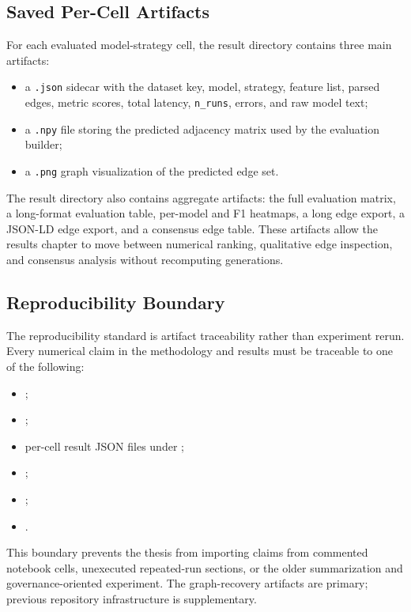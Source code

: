 \subsection{Saved Per-Cell Artifacts}

For each evaluated model-strategy cell, the result directory contains three
main artifacts:

\begin{itemize}
  \item a \texttt{.json} sidecar with the dataset key, model, strategy, feature
  list, parsed edges, metric scores, total latency, \texttt{n\_runs}, errors,
  and raw model text;
  \item a \texttt{.npy} file storing the predicted adjacency matrix used by the
  evaluation builder;
  \item a \texttt{.png} graph visualization of the predicted edge set.
\end{itemize}

The result directory also contains aggregate artifacts: the full evaluation
matrix, a long-format evaluation table, per-model and F1 heatmaps, a long edge
export, a JSON-LD edge export, and a consensus edge table. These artifacts
allow the results chapter to move between numerical ranking, qualitative edge
inspection, and consensus analysis without recomputing generations.

\subsection{Reproducibility Boundary}

The reproducibility standard is artifact traceability rather than experiment
rerun. Every numerical claim in the methodology and results must be traceable
to one of the following:

\begin{itemize}
  \item {};
  \item {};
  \item per-cell result JSON files under ;
  \item {};
  \item {};
  \item {}.
\end{itemize}

This boundary prevents the thesis from importing claims from commented
notebook cells, unexecuted repeated-run sections, or the older summarization
and governance-oriented experiment. The graph-recovery artifacts are primary;
previous repository infrastructure is supplementary.

